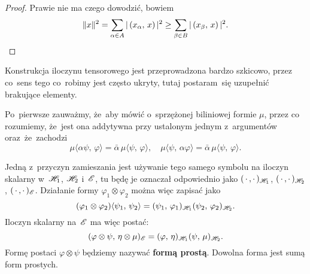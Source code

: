 \documentclass[a4paper,11pt]{article}
\begin{document}
\begin{proof}

  Prawie nie ma czego dowodzić, bowiem
  \begin{equation*}
    \label{eq:RS-Vol-I-s01-26}
    \lVert{  x  }\rVert^{ 2 } = \sum_{ \alpha \in A } |\, {  ( x_{ \alpha }, \, x )  } \,|^{ 2 }
    \geq \sum_{ \beta \in B } |\, {  ( x_{ \beta }, \, x )  } \,|^{ 2 }.
  \end{equation*}

\end{proof}

\vspace{\spaceFour}



\start {} Konstrukcja iloczynu tensorowego jest przeprowadzona
bardzo szkicowo, przez co~sens tego co~robimy jest często ukryty,
tutaj postaram~się uzupełnić brakujące elementy.

Po~pierwsze zauważmy, że~aby mówić o~sprzężonej biliniowej formie
$\mu$, przez co rozumiemy, że~jest ona addytywna przy ustalonym
jednym z~argumentów oraz~że~zachodzi
\begin{equation}
  \label{eq:RS-Vol-I-s01-27}
  \mu\langle \alpha \psi, \, \varphi \rangle = \bar{ \alpha } \, \mu\langle \psi, \, \varphi \rangle, \quad
  \mu\langle \psi, \, \alpha \varphi \rangle =
  \bar{ \alpha } \, \mu\langle \psi, \, \varphi \rangle.
\end{equation}

Jedną z~przyczyn zamieszania jest używanie tego samego symbolu na
iloczyn skalarny w~$\mathcal{H}_{ 1 }$, $\mathcal{H}_{ 2 }$ i~$\mathcal{E}$, tu będę je
oznaczał odpowiednio jako $( \, \cdot \,, \cdot \, )_{ \mathcal{H}_{ 1 } }$,
$( \, \cdot \,, \cdot \, )_{ \mathcal{H}_{ 2 } }$, $( \, \cdot \,, \cdot \, )_{ \mathcal{E} }$.
Działanie formy $\varphi_{ 1 } \otimes \varphi_{ 2 }$ można więc zapisać jako
\begin{equation}
  \label{eq:RS-Vol-I-s01-28}
  ( \varphi_{ 1 } \otimes \varphi_{ 2 } ) \langle \psi_{ 1 }, \, \psi_{ 2 } \rangle
  =
  ( \psi_{ 1 }, \, \varphi_{ 1 } )_{ \mathcal{H}_{ 1 } }
  ( \psi_{ 2 }, \, \varphi_{ 2 } )_{ \mathcal{H}_{ 2 } }.
\end{equation}
Iloczyn skalarny na~$\mathcal{E}$ ma więc postać:
\begin{equation}
  \label{eq:RS-Vol-I-s01-29}
  ( \varphi \otimes  \psi, \, \eta \otimes \mu )_{ \mathcal{E} }
  = ( \varphi, \, \eta )_{ \mathcal{H}_{ 1 } } ( \psi, \,  \mu )_{ \mathcal{H}_{ 2 } }.
\end{equation}
Formę postaci $\varphi \otimes \psi$ będziemy nazywać \textbf{formą prostą}.
Dowolna forma jest sumą form prostych.
\end{document}
